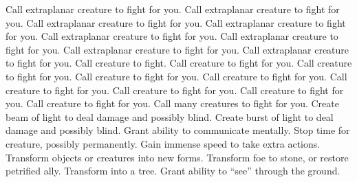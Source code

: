     {Call extraplanar creature to fight for you.}
    {Call extraplanar creature to fight for you.}
    {Call extraplanar creature to fight for you.}
    {Call extraplanar creature to fight for you.}
    {Call extraplanar creature to fight for you.}
    {Call extraplanar creature to fight for you.}
    {Call extraplanar creature to fight for you.}
    {Call extraplanar creature to fight for you.}
    {Call creature to fight.}
    {Call creature to fight for you.}
    {Call creature to fight for you.}
    {Call creature to fight for you.}
    {Call creature to fight for you.}
    {Call creature to fight for you.}
    {Call creature to fight for you.}
    {Call creature to fight for you.}
    {Call creature to fight for you.}
    {Call many creatures to fight for you.}
    {Create beam of light to deal damage and possibly blind.}
    {Create burst of light to deal damage and possibly blind.}
    {Grant ability to communicate mentally.}
    {Stop time for creature, possibly permanently.}
    {Gain immense speed to take extra actions.}
    {Transform objects or creatures into new forms.}
    {Transform foe to stone, or restore petrified ally.}
    {Transform into a tree.}
    {Grant ability to ``see'' through the ground.}
